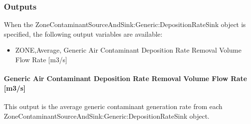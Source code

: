 \subsubsection{Outputs}\label{outputs-13-002}

When the ZoneContaminantSourceAndSink:Generic:DepositionRateSink object is specified, the following output variables are available:

\begin{itemize}
    \tightlist
  \item
    ZONE,Average, Generic Air Contaminant Deposition Rate Removal Volume Flow Rate {[}m3/s{]}
\end{itemize}

\paragraph{Generic Air Contaminant Deposition Rate Removal Volume Flow Rate {[}m3/s{]}}\label{generic-air-contaminant-deposition-rate-removal-volume-flow-rate-m3s}

This output is the average generic contaminant generation rate from each Zone\-Contaminant\-Source\-And\-Sink:\-Generic:\-Deposition\-Rate\-Sink object.
